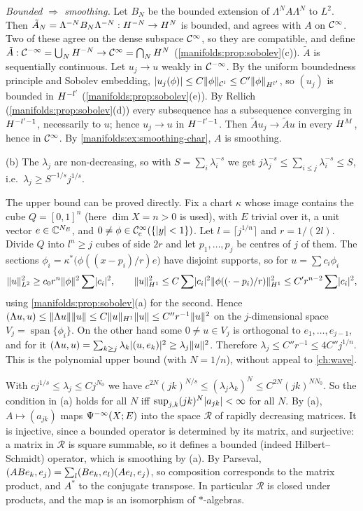 \emph{Bounded $\Rightarrow$ smoothing.} Let $B_N$ be the bounded extension of $\Lambda^NA\Lambda^N$
to $L^2$. Then $\tilde A_N=\Lambda^{-N}B_N\Lambda^{-N}:H^{-N}\to H^{N}$ is bounded, and agrees with
$A$ on $\mathcal{C}^\infty$. Two of these agree on the dense subspace $\mathcal{C}^\infty$, so they are compatible, and
define $\tilde A:\mathcal{C}^{-\infty}=\bigcup_NH^{-N}\to\mathcal{C}^\infty=\bigcap_NH^{N}$ (\cref{manifolds:prop:sobolev}(c)).
$\tilde A$ is sequentially continuous. Let $u_j\to u$ weakly in $\mathcal{C}^{-\infty}$. By the uniform
boundedness principle and Sobolev embedding, $\lvert u_j(\phi)\rvert\le C\lVert \phi\rVert_{\mathcal C^l}\le C'\lVert \phi\rVert_{H^{l'}}$,
so $(u_j)$ is bounded in $H^{-l'}$ (\cref{manifolds:prop:sobolev}(e)). By Rellich
(\cref{manifolds:prop:sobolev}(d)) every subsequence has a subsequence converging in
$H^{-l'-1}$, necessarily to $u$; hence $u_j\to u$ in $H^{-l'-1}$. Then
$\tilde Au_j\to\tilde Au$ in every $H^{M}$, hence in $\mathcal{C}^\infty$. By
\cref{manifolds:ex:smoothing-char}, $A$ is smoothing.

(b) The $\lambda_j$ are non-decreasing, so with $S=\sum_i\lambda_i^{-s}$ we get
$j\lambda_j^{-s}\le\sum_{i\le j}\lambda_i^{-s}\le S$, i.e.\ $\lambda_j\ge S^{-1/s}j^{1/s}$.

The upper bound can be proved directly. Fix a chart $\kappa$ whose image contains the
cube $Q=[0,1]^n$ (here $\dim X=n>0$ is used), with $E$ trivial over it, a unit vector
$e\in\mathbb{C}^{N_E}$, and $0\ne\phi\in\mathcal{C}^\infty_{\mathrm{c}}(\{\lvert y\rvert<1\})$. Let $l=\lceil j^{1/n}\rceil$ and $r=1/(2l)$. Divide $Q$ into
$l^n\ge j$ cubes of side $2r$ and let $p_1,\dots,p_j$ be centres of $j$ of them. The sections
$\phi_i=\kappa^*\big(\phi((x-p_i)/r)e\big)$ have disjoint supports, so for $u=\sum c_i\phi_i$
\begin{equation*}
\lVert u\rVert^2_{L^2}\ge c_0r^n\lVert \phi\rVert^2\sum\lvert c_i\rvert^2,\qquad\lVert u\rVert^2_{H^{1}}\le C\sum\lvert c_i\rvert^2\lVert \phi((\cdot-p_i)/r)\rVert^2_{H^{1}}
\le C'r^{n-2}\sum\lvert c_i\rvert^2 ,
\end{equation*}
using \cref{manifolds:prop:sobolev}(a) for the second. Hence
$( \Lambda u, u)\le\lVert \Lambda u\rVert\lVert u\rVert\le C\lVert u\rVert_{H^{1}}\lVert u\rVert\le C''r^{-1}\lVert u\rVert^2$ on the
$j$-dimensional space $V_j=\operatorname{span}\{\phi_i\}$. On the other hand some $0\ne u\in V_j$ is
orthogonal to $e_1,\dots,e_{j-1}$, and for it
$( \Lambda u, u)=\sum_{k\ge j}\lambda_k\lvert ( u, e_k)\rvert^2\ge\lambda_j\lVert u\rVert^2$. Therefore
$\lambda_j\le C''r^{-1}\le4C''j^{1/n}$. This is the polynomial upper bound (with $N=1/n$),
without appeal to \cref{ch:wave}.

With $cj^{1/s}\le\lambda_j\le Cj^{N_0}$ we have $c^{2N}(jk)^{N/s}\le(\lambda_j\lambda_k)^N\le C^{2N}(jk)^{NN_0}$. So the
condition in (a) holds for all $N$ iff $\sup_{j,k}(jk)^N\lvert a_{jk}\rvert<\infty$ for all $N$. By (a),
$A\mapsto(a_{jk})$ maps $\Psi^{-\infty}(X;E)$ into the space $\mathcal R$ of rapidly decreasing
matrices. It is injective, since a bounded operator is determined by its matrix, and
surjective: a matrix in $\mathcal R$ is square summable, so it defines a bounded (indeed
Hilbert--Schmidt) operator, which is smoothing by (a). By Parseval,
$( ABe_k, e_j)=\sum_l( Be_k, e_l)( Ae_l, e_j)$, so composition corresponds to the
matrix product, and $A^*$ to the conjugate transpose. In particular $\mathcal R$ is closed
under products, and the map is an isomorphism of $*$-algebras.

